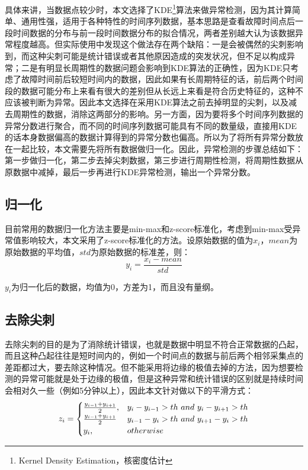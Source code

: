 具体来讲，当数据点较少时，本文选择了KDE\footnote{Kernel Density Estimation，核密度估计}算法来做异常检测，因为其计算简单、通用性强，适用于各种特性的时间序列数据，基本思路是查看故障时间点后一段时间数据的分布与前一段时间数据分布的拟合情况，两者差别越大认为该数据异常程度越高。但实际使用中发现这个做法存在两个缺陷：一是会被偶然的尖刺影响到，而这种尖刺可能是统计错误或者其他原因造成的突发状况，但不足以构成异常；二是有明显长周期性的数据问题会影响到KDE算法的正确性，因为KDE只考虑了故障时间前后较短时间内的数据，因此如果有长周期特征的话，前后两个时间段的数据可能分布上来看有很大的差别但从长远上来看是符合历史特征的，这种不应该被判断为异常。因此本文选择在采用KDE算法之前去掉明显的尖刺，以及减去周期性的数据，消除这两部分的影响。另一方面，因为要将多个时间序列数据的异常分数进行聚合，而不同的时间序列数据可能具有不同的数量级，直接用KDE的话本身数据偏高的数据计算得到的异常分数也偏高。所以为了将所有异常分数放在一起比较，本文需要先将所有数据做归一化。因此，异常检测的步骤总结如下：第一步做归一化，第二步去掉尖刺数据，第三步进行周期性检测，将周期性数据从原数据中减掉，最后一步再进行KDE异常检测，输出一个异常分数。
\subsection{归一化}
目前常用的数据归一化方法主要是min-max和z-score标准化，考虑到min-max受异常值影响较大，本文采用了z-score标准化的方法。设原始数据的值为$x_i$，$mean$为原始数据的平均值，$std$为原始数据的标准差，则：
\begin{equation*}
y_i = \frac{x_i-mean}{std}
\end{equation*}

$y_i$为归一化后的数据，均值为0，方差为1，而且没有量纲。
\subsection{去除尖刺}
去除尖刺的目的是为了消除统计错误，也就是数据中明显不符合正常数据的凸起，而且这种凸起往往是短时间内的，例如一个时间点的数据与前后两个相邻采集点的差距都过大，要去除这种情况。但不能采用将边缘的极值去掉的方法，因为想要检测的异常可能就是处于边缘的极值，但是这种异常和统计错误的区别就是持续时间会相对久一些（例如5分钟以上），因此本文针对做以下的平滑方式：
\begin{equation*}
z_i = \begin{cases} \frac{y_{i-1} + y_{i+1}}{2}, & y_i - y_{i-1} > th\ and\ y_i - y_{i+1} > th \cr \frac{y_{i-1} + y_{i+1}}{2} & y_{i-1} - y_i > th\ and\ y_{i+1} - y_i > th \cr y_i, & otherwise  \end{cases}
\end{equation*}

